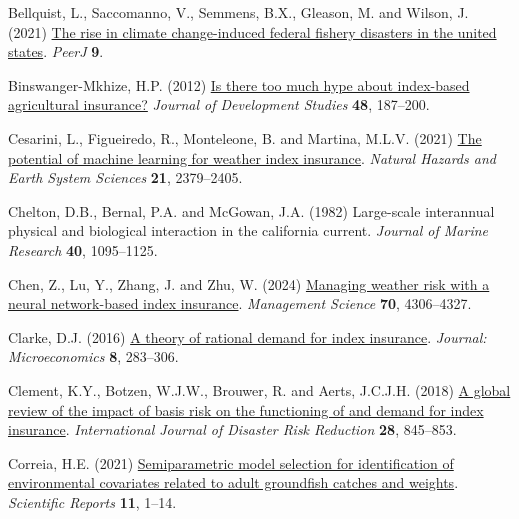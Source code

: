 \documentclass[
  letterpaper,
  DIV=11,
  numbers=noendperiod]{scrartcl}
\newlength{\cslhangindent}
\newlength{\cslentryspacingunit} %
\newenvironment{CSLReferences}[2] %
 {%
  \setlength{\parindent}{0pt}
  \ifodd #1
  \let\oldpar\par
  \def\par{\hangindent=\cslhangindent\oldpar}
  \fi
  \setlength{\parskip}{#2\cslentryspacingunit}
 }%
 {}
\begin{document}
\hypertarget{refs}{}
\begin{CSLReferences}{1}{0}
\leavevmode{}%
Bellquist, L., Saccomanno, V., Semmens, B.X., Gleason, M. and Wilson, J.
(2021) \href{https://doi.org/10.7717/peerj.11186}{The rise in climate
change-induced federal fishery disasters in the united states}.
\emph{PeerJ} \textbf{9}.

\leavevmode{}%
Binswanger-Mkhize, H.P. (2012)
\href{https://doi.org/10.1080/00220388.2011.625411}{Is there too much
hype about index-based agricultural insurance?} \emph{Journal of
Development Studies} \textbf{48}, 187--200.

\leavevmode{}%
Cesarini, L., Figueiredo, R., Monteleone, B. and Martina, M.L.V. (2021)
\href{https://doi.org/10.5194/nhess-21-2379-2021}{The potential of
machine learning for weather index insurance}. \emph{Natural Hazards and
Earth System Sciences} \textbf{21}, 2379--2405.

\leavevmode{}%
Chelton, D.B., Bernal, P.A. and McGowan, J.A. (1982) Large-scale
interannual physical and biological interaction in the california
current. \emph{Journal of Marine Research} \textbf{40}, 1095--1125.

\leavevmode{}%
Chen, Z., Lu, Y., Zhang, J. and Zhu, W. (2024)
\href{https://doi.org/10.1287/mnsc.2023.4902}{Managing weather risk with
a neural network-based index insurance}. \emph{Management Science}
\textbf{70}, 4306--4327.

\leavevmode{}%
Clarke, D.J. (2016) \href{https://doi.org/10.1257/mic.20140103}{A theory
of rational demand for index insurance}. \emph{Journal: Microeconomics}
\textbf{8}, 283--306.

\leavevmode{}%
Clement, K.Y., Botzen, W.J.W., Brouwer, R. and Aerts, J.C.J.H. (2018)
\href{https://doi.org/10.1016/j.ijdrr.2018.01.001}{A global review of
the impact of basis risk on the functioning of and demand for index
insurance}. \emph{International Journal of Disaster Risk Reduction}
\textbf{28}, 845--853.

\leavevmode{}%
Correia, H.E. (2021)
\href{https://doi.org/10.1038/s41598-021-89398-8}{Semiparametric model
selection for identification of environmental covariates related to
adult groundfish catches and weights}. \emph{Scientific Reports}
\textbf{11}, 1--14.


\end{CSLReferences}
\end{document}
